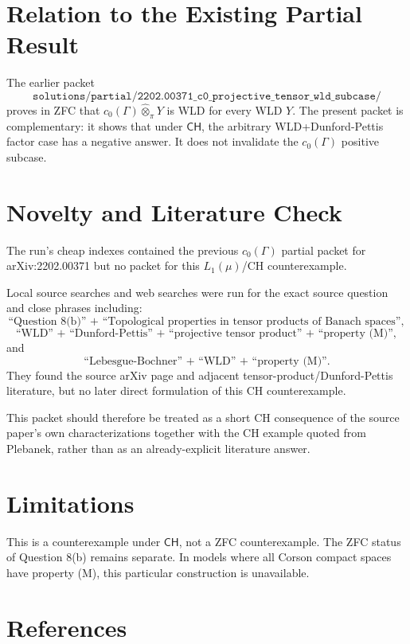 \documentclass[11pt]{article}
\newcommand{\otpi}{\widehat{\otimes}_{\pi}}
\newcommand{\CH}{\mathsf{CH}}
\begin{document}
\section*{Relation to the Existing Partial Result}

The earlier packet
\[
\texttt{solutions/partial/2202.00371\_c0\_projective\_tensor\_wld\_subcase/}
\]
proves in ZFC that \(c_0(\Gamma)\otpi Y\) is WLD for every WLD \(Y\).  The
present packet is complementary: it shows that under \(\CH\), the arbitrary
WLD+Dunford-Pettis factor case has a negative answer.  It does not invalidate
the \(c_0(\Gamma)\) positive subcase.

\section*{Novelty and Literature Check}

The run's cheap indexes contained the previous \(c_0(\Gamma)\) partial packet
for arXiv:2202.00371 but no packet for this \(L_1(\mu)\)/CH counterexample.

Local source searches and web searches were run for the exact source question
and close phrases including:
\[
\text{``Question 8(b)'' + ``Topological properties in tensor products of Banach spaces''},
\]
\[
\text{``WLD'' + ``Dunford-Pettis'' + ``projective tensor product'' + ``property (M)''},
\]
and
\[
\text{``Lebesgue-Bochner'' + ``WLD'' + ``property (M)''}.
\]
They found the source arXiv page and adjacent tensor-product/Dunford-Pettis
literature, but no later direct formulation of this CH counterexample.

This packet should therefore be treated as a short CH consequence of
the source paper's own characterizations together with the CH example quoted
from Plebanek, rather than as an already-explicit literature answer.

\section*{Limitations}

This is a counterexample under \(\CH\), not a ZFC counterexample.  The ZFC
status of Question 8(b) remains separate.  In models where all Corson compact
spaces have property (M), this particular construction is unavailable.

\section*{References}
\end{document}
